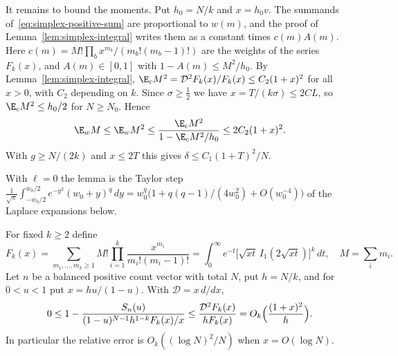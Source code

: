It remains to bound the moments. Put $h_0=N/k$ and $x=h_0v$. The summands
of~\eqref{eq:simplex-positive-sum} are proportional to $w(m)$, and the proof of
Lemma~\ref{lem:simplex-integral} writes them as a constant times
$c(m)A(m)$. Here $c(m)=M!\prod_bx^{m_b}/(m_b!(m_b-1)!)$ are the weights of the
series $F_k(x)$, and $A(m)\in[0,1]$ with $1-A(m)\le M^2/h_0$. By
Lemma~\ref{lem:simplex-integral}, $\E_cM^2=\mathcal D^2F_k(x)/F_k(x)\le
C_2(1+x)^2$ for all $x>0$, with $C_2$ depending on $k$. Since $\sigma\ge\frac12$
we have $x=T/(k\sigma)\le2CL$, so $\E_cM^2\le h_0/2$ for $N\ge N_0$. Hence
\[
 \E_wM\le\E_wM^2\le\frac{\E_cM^2}{1-\E_cM^2/h_0}\le2C_2(1+x)^2.
\]
With $g\ge N/(2k)$ and $x\le2T$ this gives $\delta\le C_1(1+T)^2/N$.


With $\ell=0$ the lemma is the Taylor step
$\frac1{\sqrt\pi}\int_{-w_0/2}^{w_0/2}e^{-y^2}(w_0+y)^q\,dy
=w_0^q\bigl(1+q(q-1)/(4w_0^2)+O(w_0^{-4})\bigr)$ of the Laplace expansions below.

\begin{lemma}\label{lem:simplex-integral}
For fixed $k\ge2$ define
\begin{equation}\label{eq:simplex-F}
F_k(x)=\sum_{m_1,\ldots,m_k\ge1}
M!\prod_{i=1}^k\frac{x^{m_i}}{m_i!(m_i-1)!}
=\int_0^\infty e^{-t}\bigl[\sqrt{xt}\,I_1(2\sqrt{xt})\bigr]^k\,dt,
\quad M=\sum_im_i.
\end{equation}
Let $n$ be a balanced positive count vector with total $N$, put $h=N/k$, and for
$0<u<1$ put $x=hu/(1-u)$. With $\mathcal D=x\,d/dx$,
\begin{equation}\label{eq:simplex-discrete-comparison}
0\le 1-\frac{S_n(u)}{(1-u)^{N-1}h^{1-k}F_k(x)/x}
\le\frac{\mathcal D^2F_k(x)}{hF_k(x)}
=O_k\Bigl(\frac{(1+x)^2}{h}\Bigr).
\end{equation}
In particular the relative error is $O_k((\log N)^2/N)$ when $x=O(\log N)$.
\end{lemma}

